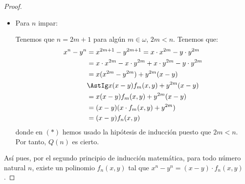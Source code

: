 \documentclass[12pt]{article}
\begin{document}
\begin{ejercicio}[Inducción]
\begin{observacion}
\begin{proof}
\begin{itemize}
\begin{itemize}
                            \item Para $n$ impar:
                            
                            Tenemos que $n=2m+1$ para algún $m\in\omega$, $2m<n$. Tenemos que:
                            \begin{align*}
                                x^n - y^n &= x^{2m+1} - y^{2m+1} = x\cdot x^{2m} - y\cdot y^{2m} \\
                                &= x\cdot x^{2m} - x\cdot y^{2m} + x\cdot y^{2m} - y\cdot y^{2m} \\
                                &= x(x^{2m} - y^{2m}) + y^{2m}(x-y)\\
                                &\AstIg x(x-y)f_m(x, y) + y^{2m}(x-y) \\
                                &= x(x-y)f_m(x, y) + y^{2m}(x-y) \\
                                &= (x-y)(x\cdot f_m(x, y) + y^{2m}) \\
                                &= (x-y)f_{n}(x, y)
                            \end{align*}
                            donde en $(\ast)$ hemos usado la hipótesis de inducción puesto que $2m<n$. Por tanto, $Q(n)$ es cierto.
                        \end{itemize}
                \end{itemize}

                Así pues, por el segundo principio de inducción matemática, para todo número natural $n$, existe un polinomio $f_n(x, y)$ tal que $x^n - y^n = (x-y)\cdot f_n(x, y)$.
                \end{proof}
            \end{observacion}
    \end{ejercicio}
\end{document}
